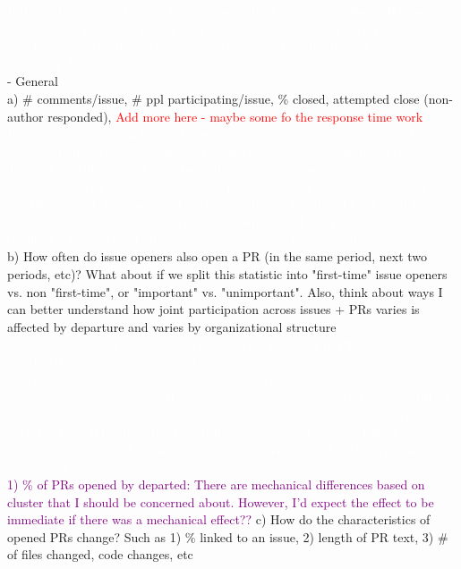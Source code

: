 \documentclass[12pt,notitlepage]{article}
\begin{document}
\begin{itemize}
\begin{enumerate}
{        \textcolor{white}{If the statistics vary, I would be concerned about mechanical effects. If these statistics don't vary, all is well. You can't use an event study with this, but the goal is to understand descriptively whether projects with different organizational structures differ}\\     
        - General\\
        a) # comments/issue, # ppl participating/issue, \% closed, attempted close (non-author responded), \textcolor{red}{Add more here - maybe some fo the response time work}\\
        \textcolor{white}{I'm hoping to better understand how issue discussion might have changed in response to departure and whether the effect varied by organizational structure. This will provide me with a better understanding of how organizational structure might be affecting issue discussion, and how changes in issue discussion lead to less PRs opened. It's possible that this may be too broad and I will need to find a way to connect this more specifically to departure. I can probably do event studies for this - think I already have event studies for \% closed}\\
        b) How often do issue openers also open a PR (in the same period, next two periods, etc)? What about if we split this statistic into "first-time" issue openers vs. non "first-time", or "important" vs. "unimportant". Also, think about ways I can better understand how joint participation across issues + PRs varies is affected by departure and varies by organizational structure \\
        \textcolor{white}{I'm hoping to better understand whose driving the effect in PRs. Understanding whether it's driven by experienced or fringe contributors can provide a clearer understanding of the effect of organizational structure, and also narrow down specific effects. For example, if it's fringe contributors who aren't opening PRs, I would want to better understand why and how they're receiving less support to open the PRs. If it's important contributors who aren't opening PRs, I would want to understand what knowledge they're missing now that the departed contributor is gone. }\\
        \textcolor{purple}{1) \% of PRs opened by departed: There are mechanical differences based on cluster that I should be concerned about. However, I'd expect the effect to be immediate if there was a mechanical effect?? } 
        c) How do the characteristics of opened PRs change? Such as 1) \% linked to an issue, 2) length of PR text, 3) \# of files changed, code changes, etc\\
}
\end{enumerate}
\end{itemize}
\end{document}
